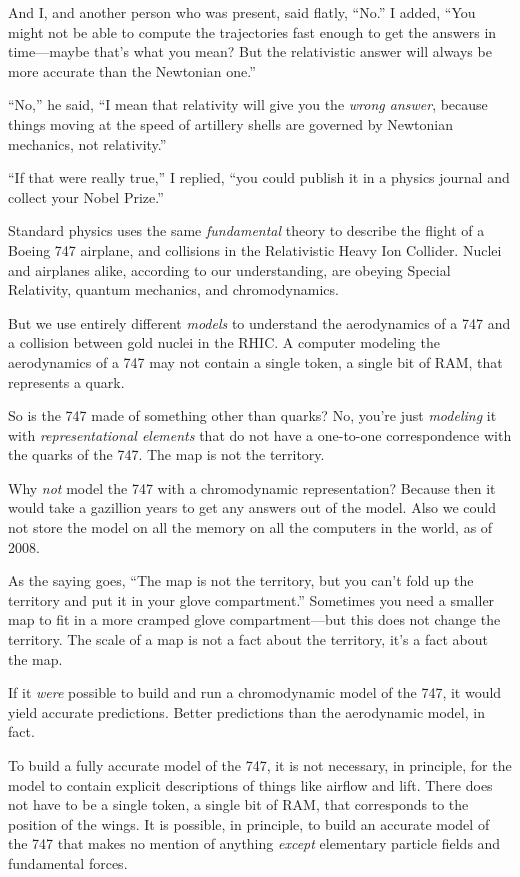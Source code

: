 {
 And I, and another person who was present, said flatly,
``No.'' I added,
``You might not be able to compute the trajectories
fast enough to get the answers in time---maybe that's
what you mean? But the relativistic answer will always be more accurate
than the Newtonian one.''}

{
 ``No,'' he said,
``I mean that relativity will give you the
\textit{wrong answer}, because things moving at the speed of artillery
shells are governed by Newtonian mechanics, not
relativity.''}

{
 ``If that were really true,'' I
replied, ``you could publish it in a physics journal
and collect your Nobel Prize.''}

{
 Standard physics uses the same \textit{fundamental} theory to
describe the flight of a Boeing 747 airplane, and collisions in the
Relativistic Heavy Ion Collider. Nuclei and airplanes alike, according
to our understanding, are obeying Special Relativity, quantum
mechanics, and chromodynamics.}

{
 But we use entirely different \textit{models} to understand the
aerodynamics of a 747 and a collision between gold nuclei in the RHIC.
A computer modeling the aerodynamics of a 747 may not contain a single
token, a single bit of RAM, that represents a quark.}

{
 So is the 747 made of something other than quarks? No,
you're just \textit{modeling} it with
\textit{representational elements} that do not have a one-to-one
correspondence with the quarks of the 747. The map is not the
territory.}

{
 Why \textit{not} model the 747 with a chromodynamic
representation? Because then it would take a gazillion years to get any
answers out of the model. Also we could not store the model on all the
memory on all the computers in the world, as of 2008.}

{
 As the saying goes, ``The map is not the
territory, but you can't fold up the territory and put
it in your glove compartment.'' Sometimes you need a
smaller map to fit in a more cramped glove compartment---but this does
not change the territory. The scale of a map is not a fact about the
territory, it's a fact about the map.}

{
 If it \textit{were} possible to build and run a chromodynamic
model of the 747, it would yield accurate predictions. Better
predictions than the aerodynamic model, in fact.}

{
 To build a fully accurate model of the 747, it is not necessary,
in principle, for the model to contain explicit descriptions of things
like airflow and lift. There does not have to be a single token, a
single bit of RAM, that corresponds to the position of the wings. It is
possible, in principle, to build an accurate model of the 747 that
makes no mention of anything \textit{except} elementary particle fields
and fundamental forces.}

